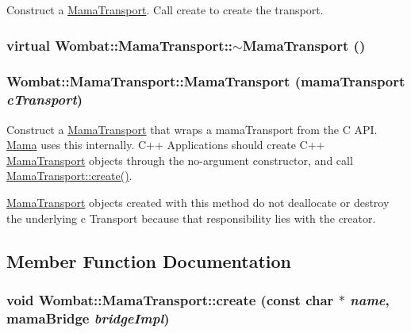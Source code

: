 Construct a \hyperlink{classWombat_1_1MamaTransport}{MamaTransport}. Call create to create the transport. \hypertarget{classWombat_1_1MamaTransport_a10748e3b1de9fca5a0c0ded42aad48a7}{
\subsubsection[{$\sim$MamaTransport}]{\setlength{\rightskip}{0pt plus 5cm}virtual Wombat::MamaTransport::$\sim$MamaTransport ()}}
\label{classWombat_1_1MamaTransport_a10748e3b1de9fca5a0c0ded42aad48a7}
\hypertarget{classWombat_1_1MamaTransport_a8512dc1364e6f2194c7b19c70572eda9}{
\subsubsection[{MamaTransport}]{\setlength{\rightskip}{0pt plus 5cm}Wombat::MamaTransport::MamaTransport (mamaTransport {\em cTransport})}}
\label{classWombat_1_1MamaTransport_a8512dc1364e6f2194c7b19c70572eda9}


Construct a \hyperlink{classWombat_1_1MamaTransport}{MamaTransport} that wraps a mamaTransport from the C API. \hyperlink{classWombat_1_1Mama}{Mama} uses this internally. C++ Applications should create C++ \hyperlink{classWombat_1_1MamaTransport}{MamaTransport} objects through the no-\/argument constructor, and call \hyperlink{classWombat_1_1MamaTransport_ae3ceca31b7e534ab297442846dceb0c7}{MamaTransport::create()}.

\hyperlink{classWombat_1_1MamaTransport}{MamaTransport} objects created with this method do not deallocate or destroy the underlying c Transport because that responsibility lies with the creator. 

\subsection{Member Function Documentation}
\hypertarget{classWombat_1_1MamaTransport_ae3ceca31b7e534ab297442846dceb0c7}{
\subsubsection[{create}]{\setlength{\rightskip}{0pt plus 5cm}void Wombat::MamaTransport::create (const char $\ast$ {\em name}, \/  mamaBridge {\em bridgeImpl})}}
\label{classWombat_1_1MamaTransport_ae3ceca31b7e534ab297442846dceb0c7}


